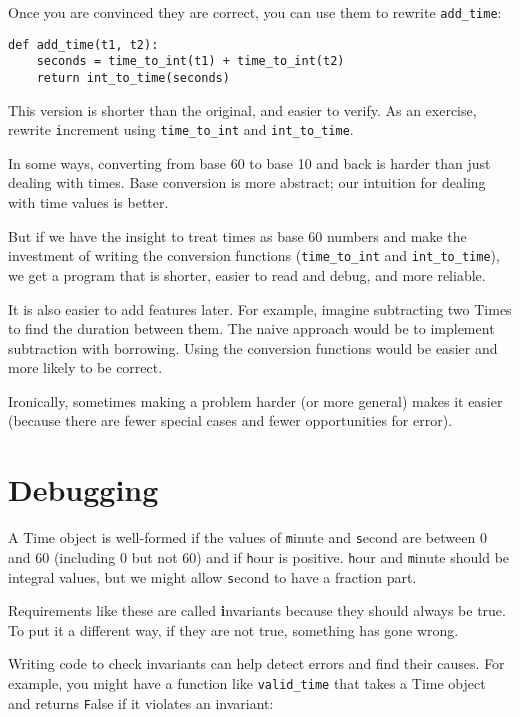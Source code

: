 \documentclass[
DIV=11,
fontsize=12,
twoside,
headinclude=false,
titlepage=firstiscover,
abstract=true,
headsepline=true,
footsepline=true,
chapterprefix=true, %
headings=big,
bibliography=totoc,%
captions=tableheading
]{scrbook}
\theoremstyle{definition}
\begin{document}
Once you are convinced they are correct, you can use them to 
rewrite \verb"add_time":

\begin{lstlisting}
def add_time(t1, t2):
    seconds = time_to_int(t1) + time_to_int(t2)
    return int_to_time(seconds)
\end{lstlisting}
%
This version is shorter than the original, and easier to verify.  As
an exercise, rewrite {\texttt increment} using \verb"time_to_int" and
\verb"int_to_time".

In some ways, converting from base 60 to base 10 and back is harder
than just dealing with times.  Base conversion is more abstract; our
intuition for dealing with time values is better.

But if we have the insight to treat times as base 60 numbers and make
the investment of writing the conversion functions (\verb"time_to_int"
and \verb"int_to_time"), we get a program that is shorter, easier to
read and debug, and more reliable.

It is also easier to add features later.  For example, imagine
subtracting two Times to find the duration between them.  The
naive approach would be to implement subtraction with borrowing.
Using the conversion functions would be easier and more likely to be
correct.

Ironically, sometimes making a problem harder (or more general) makes it
easier (because there are fewer special cases and fewer opportunities
for error).


\section{Debugging}

A Time object is well-formed if the values of {\texttt minute} and {\texttt
second} are between 0 and 60 (including 0 but not 60) and if 
{\texttt hour} is positive.  {\texttt hour} and {\texttt minute} should be
integral values, but we might allow {\texttt second} to have a
fraction part.

Requirements like these are called {\textbf invariants} because
they should always be true.  To put it a different way, if they
are not true, something has gone wrong.

Writing code to check invariants can help detect errors
and find their causes.  For example, you might have a function
like \verb"valid_time" that takes a Time object and returns
{\texttt False} if it violates an invariant:
\end{document}
